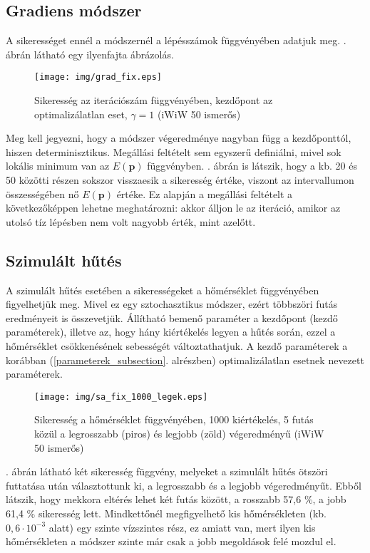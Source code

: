 \documentclass[12pt]{article}
\begin{document}
\subsection{Gradiens módszer}
A sikerességet ennél a módszernél a lépésszámok függvényében adatjuk meg. . ábrán látható egy ilyenfajta ábrázolás.
\begin{figure}[H]
	\centering
	\texttt{[image: img/grad\_fix.eps]}
	\caption{Sikeresség az iterációszám függvényében, kezdőpont az optimalizálatlan eset, $\gamma = 1$ (iWiW 50 ismerős)}
	\label{grad_fix}
\end{figure}
Meg kell jegyezni, hogy a módszer végeredménye nagyban függ a kezdőponttól, hiszen determinisztikus. Megállási feltételt sem egyszerű definiálni, mivel sok lokális minimum van az $E(\mathbf{p})$ függvényben. . ábrán is látszik, hogy a kb. 20 és 50 közötti részen sokszor visszaesik a sikeresség értéke, viszont az intervallumon összességében nő $E(\mathbf{p})$ értéke. Ez alapján a megállási feltételt a következőképpen lehetne meghatározni: akkor álljon le az iteráció, amikor az utolsó tíz lépésben nem volt nagyobb érték, mint azelőtt. %
\subsection{Szimulált hűtés}
A szimulált hűtés esetében a sikerességeket a hőmérséklet függvényében figyelhetjük meg. %
Mivel ez egy sztochasztikus módszer, ezért többszöri futás eredményeit is összevetjük. %
Állítható bemenő paraméter a kezdőpont (kezdő paraméterek), illetve az, hogy hány kiértékelés legyen a hűtés során, ezzel a hőmérséklet csökkenésének sebességét változtathatjuk. A kezdő paraméterek a korábban (\ref{parameterek_subsection}. alrészben) optimalizálatlan esetnek nevezett paraméterek. %
\begin{figure}[H]
	\centering
	\texttt{[image: img/sa\_fix\_1000\_legek.eps]}
	\caption{Sikeresség a hőmérséklet függvényében, 1000 kiértékelés, 5 futás közül a legrosszabb (piros) és legjobb (zöld) végeredményű (iWiW 50 ismerős)}
	\label{sa_legek}
\end{figure}
. ábrán látható két sikeresség függvény, melyeket a szimulált hűtés ötszöri futtatása után választottunk ki, a legrosszabb és a legjobb végeredményűt. Ebből látszik, hogy mekkora eltérés lehet két futás között, a rosszabb 57,6 \%, a jobb 61,4 \% sikeresség lett. Mindkettőnél megfigyelhető kis hőmérsékleten (kb. $0,6 \cdot 10^{-3}$ alatt) egy szinte vízszintes rész, ez amiatt van, mert ilyen kis hőmérsékleten a módszer szinte már csak a jobb megoldások felé mozdul el.
\end{document}
